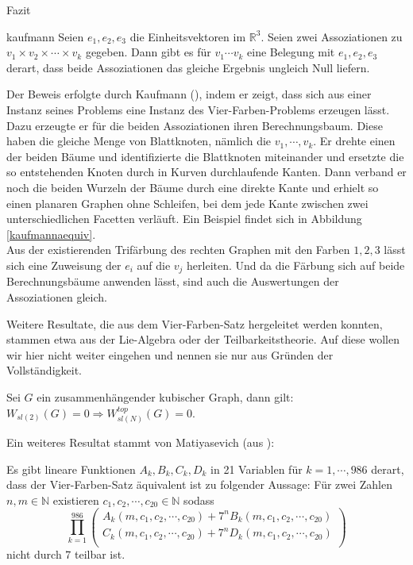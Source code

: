 \begin{chapter}{Fazit}
 \begin{satzl}{ }{kaufmann}
  Seien $e_1, e_2, e_3$ die Einheitsvektoren im $\mathbb{R}^3$. Seien zwei Assoziationen zu $v_1 \times v_2 \times \cdots \times v_k$ gegeben. Dann gibt es für $v_1 \cdots v_k$ eine Belegung mit $e_1,e_2,e_3$ derart, dass beide Assoziationen das gleiche Ergebnis ungleich Null liefern.
 \end{satzl}
 
 Der Beweis erfolgte durch Kaufmann (\cite{kaufmann}), indem er zeigt, dass sich aus einer Instanz seines Problems eine Instanz des Vier-Farben-Problems erzeugen lässt. Dazu erzeugte er für die beiden Assoziationen ihren Berechnungsbaum. Diese haben die gleiche Menge von Blattknoten, nämlich die $v_1,\cdots,v_k$. Er drehte einen der beiden Bäume und identifizierte die Blattknoten miteinander und ersetzte die so entstehenden Knoten durch in Kurven durchlaufende Kanten. Dann verband er noch die beiden Wurzeln der Bäume durch eine direkte Kante und erhielt so einen planaren Graphen ohne Schleifen, bei dem jede Kante zwischen zwei unterschiedlichen Facetten verläuft. Ein Beispiel findet sich in Abbildung \ref{kaufmannaequiv}.\\
 Aus der existierenden Trifärbung des rechten Graphen mit den Farben $1,2,3$ lässt sich eine Zuweisung der $e_i$ auf die $v_j$ herleiten. Und da die Färbung sich auf beide Berechnungsbäume anwenden lässt, sind auch die Auswertungen der Assoziationen gleich.
 
 Weitere Resultate, die aus dem Vier-Farben-Satz hergeleitet werden konnten, stammen etwa aus der Lie-Algebra oder der Teilbarkeitstheorie. Auf diese wollen wir hier nicht weiter eingehen und nennen sie nur aus Gründen der Vollständigkeit.
 
 \begin{satz}{}
  Sei $G$ ein zusammenhängender kubischer Graph, dann gilt: $W_{sl(2)}(G) = 0 \Rightarrow W_{sl(N)}^{top}(G) = 0$.
 \end{satz}
 
 Ein weiteres Resultat stammt von Matiyasevich (aus \cite{matiyasevich}):
 
 \begin{satz}{}
  Es gibt lineare Funktionen $A_k,B_k,C_k,D_k$ in 21 Variablen für $k = 1,\cdots,986$ derart, dass der Vier-Farben-Satz äquivalent ist zu folgender Aussage: Für zwei Zahlen $n,m \in \mathbb{N}$ existieren $c_1,c_2,\cdots,c_{20} \in \mathbb{N}$ sodass
  \[ \prod_{k=1}^{986} \begin{pmatrix}
                        A_k(m,c_1,c_2,\cdots,c_{20})+7^nB_k(m,c_1,c_2,\cdots,c_{20}) \\
                        C_k(m,c_1,c_2,\cdots,c_{20})+7^nD_k(m,c_1,c_2,\cdots,c_{20}) \\
                       \end{pmatrix} \]
  nicht durch 7 teilbar ist.
 \end{satz}
\end{chapter}